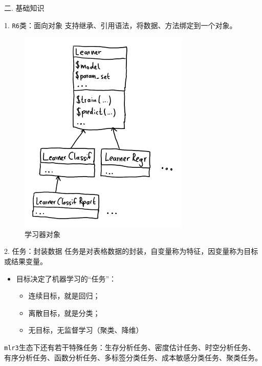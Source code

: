 \documentclass[
  11pt,
  ignorenonframetext,
  dvipsnames,UTF8]{beamer}
\providecommand{\tightlist}{%
  \setlength{\itemsep}{0pt}\setlength{\parskip}{0pt}}
\begin{document}
\begin{frame}[fragile]{二. 基础知识}
\protect\hypertarget{ux4e8c.-ux57faux7840ux77e5ux8bc6}{}
\begin{block}{1. \texttt{R6}类：面向对象}
\protect\hypertarget{r6ux7c7bux9762ux5411ux5bf9ux8c61}{}
支持继承、引用语法，将数据、方法绑定到一个对象。

\begin{figure}

{\centering \includegraphics[width=0.4\linewidth]{images/learner_object} 

}

\caption{学习器对象}\label{fig:unnamed-chunk-6}
\end{figure}
\end{block}
\end{frame}

\begin{frame}[fragile]{2. 任务：封装数据}
\protect\hypertarget{ux4efbux52a1ux5c01ux88c5ux6570ux636e}{}
任务是对表格数据的封装，自变量称为特征，因变量称为目标或结果变量。

\begin{itemize}
\tightlist
\item
  目标决定了机器学习的``任务''：

  \begin{itemize}
  \tightlist
  \item
    连续目标，就是回归；
  \item
    离散目标，就是分类；
  \item
    无目标，无监督学习（聚类、降维）
  \end{itemize}
\end{itemize}

\texttt{mlr3}生态下还有若干特殊任务：生存分析任务、密度估计任务、时空分析任务、有序分析任务、函数分析任务、多标签分类任务、成本敏感分类任务、聚类任务。
\end{frame}
\end{document}

